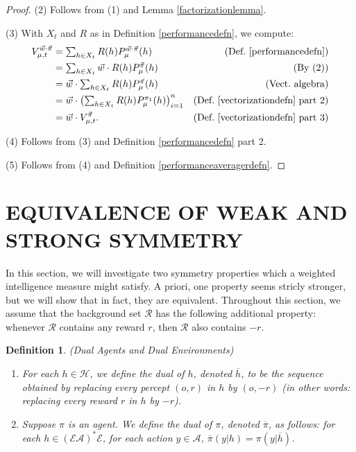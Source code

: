 \documentclass[twoside]{article}
\newtheorem{definition}[theorem]{Definition}
\begin{document}
\begin{proof}
    (2) Follows from (1) and Lemma \ref{factorizationlemma}.

    (3) With $X_t$ and $R$ as in Definition \ref{performancedefn}, we compute:
    \begin{align*}
        V^{\vec w\cdot\vec\pi}_{\mu,t}
            &= \mbox{$\sum_{h\in X_t}R(h)P^{\vec w\cdot\vec\pi}_\mu(h)$}
                &\mbox{(Def.\ \ref{performancedefn})}\\
            &= \mbox{$\sum_{h\in X_t}\vec w\cdot R(h)P^{\vec\pi}_\mu(h)$}
                &\mbox{(By (2))}\\
            &= \mbox{$\vec w\cdot \sum_{h\in X_t}R(h)P^{\vec\pi}_\mu(h)$}
                &\mbox{(Vect.\ algebra)}\\
            &= \mbox{$
                \vec w\cdot
                \left(
                    \sum_{h\in X_t}R(h)P^{\pi_1}_\mu(h)
                \right)_{i=1}^n
                $}
                &\mbox{(Def.\ \ref{vectorizationdefn} part 2)}\\
            &= \vec w\cdot V^{\vec\pi}_{\mu,t}.
                &\mbox{(Def.\ \ref{vectorizationdefn} part 3)}
    \end{align*}

    (4) Follows from (3) and Definition \ref{performancedefn} part 2.

    (5) Follows from (4) and Definition \ref{performanceaveragerdefn}.
\end{proof}

\section{EQUIVALENCE OF WEAK AND STRONG SYMMETRY}

In this section, we will investigate two symmetry properties
which a weighted intelligence measure might satisfy. A priori, one
property seems stricly stronger, but we will show
that in fact, they are equivalent. Throughout this section, we
assume that the background set $\mathcal R$ has the following
additional property:
whenever $\mathcal R$ contains any reward $r$, then $\mathcal R$
also contains $-r$.

\begin{definition}
\label{dualagentsdefn}
(Dual Agents and Dual Environments)
\begin{enumerate}
    \item
    For each $h\in\mathcal H$,
    we define the \emph{dual} of $h$, denoted $\overline h$, to be
    the sequence obtained
    by replacing every percept $(o,r)$ in $h$ by $(o,-r)$ (in other words:
    replacing every reward $r$ in $h$ by $-r$).
    \item
    Suppose $\pi$ is an agent.
    We define the \emph{dual} of $\pi$, denoted $\overline \pi$, as follows:
    for each $h\in (\mathcal E\mathcal A)^*\mathcal E$,
    for each action $y\in\mathcal A$,
    $\overline\pi(y|h)=\pi(y|\overline h)$.
\end{enumerate}
\end{definition}
\end{document}
